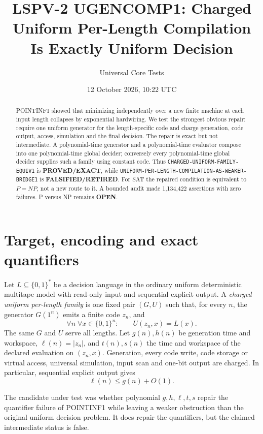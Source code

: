 \documentclass[11pt]{article}
\title{LSPV-2 UGENCOMP1: Charged Uniform Per-Length Compilation Is Exactly Uniform Decision}
\author{Universal Core Tests}
\date{12 October 2026, 10:22 UTC}
\newcommand{\PROVED}{\textbf{PROVED/EXACT}}
\newcommand{\OPEN}{\textbf{OPEN}}
\newcommand{\RET}{\textbf{FALSIFIED/RETIRED}}
\begin{document}
\maketitle

\begin{abstract}
POINTINF1 showed that minimizing independently over a new finite machine at
each input length collapses by exponential hardwiring.  We test the strongest
obvious repair: require one uniform generator for the length-specific code and
charge generation, code output, access, simulation and the final decision.
The repair is exact but not intermediate.  A polynomial-time generator and a
polynomial-time evaluator compose into one polynomial-time global decider;
conversely every polynomial-time global decider supplies such a family using
constant code.  Thus \texttt{CHARGED-UNIFORM-FAMILY-EQUIV1} is
\PROVED, while \texttt{UNIFORM-PER-LENGTH-COMPILATION-AS-WEAKER-BRIDGE1}
is \RET.  For SAT the repaired condition is equivalent to \(P=NP\), not a
new route to it.  A bounded audit made 1,134,422 assertions with zero
failures.  P versus NP remains \OPEN.
\end{abstract}

\section{Target, encoding and exact quantifiers}

Let \(L\subseteq\{0,1\}^*\) be a decision language in the ordinary uniform
deterministic multitape model with read-only input and sequential explicit
output.  A \emph{charged uniform per-length family} is one fixed pair
\((G,U)\) such that, for every \(n\), the generator \(G(1^n)\) emits a finite
code \(z_n\), and
\[
  \forall n\;\forall x\in\{0,1\}^n:\qquad
  U(z_n,x)=L(x).                                      \tag{1}
\]
The same \(G\) and \(U\) serve all lengths.  Let \(g(n),h(n)\) be generation
time and workspace, \(\ell(n)=|z_n|\), and \(t(n),s(n)\) the time and
workspace of the declared evaluation on \((z_n,x)\).  Generation, every code
write, code storage or virtual access, universal simulation, input scan and
one-bit output are charged.  In particular, sequential explicit output gives
\[
  \ell(n)\le g(n)+O(1).                               \tag{2}
\]

The candidate under test was whether polynomial \(g,h,\ell,t,s\) repair the
quantifier failure of POINTINF1 while leaving a weaker obstruction than the
original uniform decision problem.  It does repair the quantifiers, but the
claimed intermediate status is false.
\end{document}
